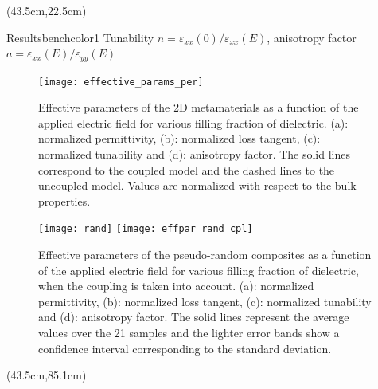 \documentclass[final,12pt]{beamer} %
\begin{document}
\begin{frame}
\begin{textblock*}{38.5cm}
\end{textblock*}
\begin{textblock*}{38.5cm}(43.5cm,22.5cm)
\begin{posterblock}{Results}{benchcolor1}
  \vspace*{-0.7em}
Tunability $n = \varepsilon_{xx}(0)/\varepsilon_{xx}(E)$, anisotropy factor
$a = \varepsilon_{xx}(E)/\varepsilon_{yy}(E)$

\begin{figure}[!t]
 \centering
 \texttt{[image: effective\_params\_per]}
 \caption{Effective parameters of the 2D metamaterials as a function of the
  applied electric field for various filling fraction of dielectric.
  (a): normalized permittivity, (b): normalized loss tangent, (c): normalized tunability and
  (d): anisotropy factor. The solid lines correspond to the coupled model and
  the dashed lines to the uncoupled model. Values are normalized with respect to the bulk properties.}
 \label{eff_par_2D_TM}
\end{figure}

   \vspace*{-0.7em}
 \begin{figure}[!t]
  \centering
  \texttt{[image: rand]}
  \texttt{[image: effpar\_rand\_cpl]}
  \caption{Effective parameters of the pseudo-random composites as a function of the
   applied electric field for various filling fraction of dielectric, when the
   coupling is taken into account.
   (a): normalized permittivity, (b): normalized loss tangent, (c): normalized tunability and
   (d): anisotropy factor. The solid lines represent the average values
   over the 21 samples and the lighter error bands show a confidence interval corresponding to
   the standard deviation.}
  \label{eff_par_2Drand_TM}
 \end{figure}
\end{posterblock}

\end{textblock*}
%
\begin{textblock*}{38.5cm}(43.5cm,85.1cm)
\color{fresnelblack}
\printbibliography
\end{textblock*}


\end{frame}
\end{document}
